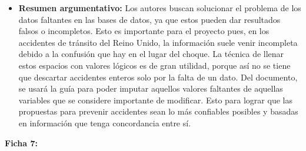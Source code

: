 \documentclass[12pt]{article}
\begin{document}
\begin{itemize}
	\item \textbf{Resumen argumentativo:} Los autores buscan solucionar el problema 
	de los datos faltantes en las bases de datos, ya que estos pueden dar resultados 
	falsos o incompletos. Esto es importante para el proyecto pues, en los accidentes 
	de tránsito del Reino Unido, la información suele venir incompleta debido a la 
	confusión que hay en el lugar del choque. La técnica de llenar estos espacios con 
	valores lógicos es de gran utilidad, porque así no se tiene que descartar accidentes 
	enteros solo por la falta de un dato. Del documento, se usará la guía para poder 
	imputar aquellos valores faltantes de aquellas variables que se considere importante 
	de modificar. Esto para lograr que las propuestas para prevenir accidentes sean lo más 
	confiables posibles y basadas en información que tenga concordancia entre sí.\\
	\end{itemize}

\textbf{Ficha 7:}
\end{document}
